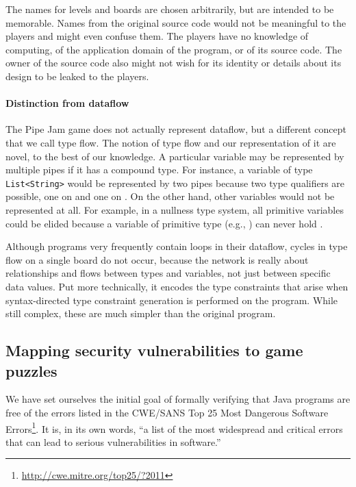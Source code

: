 \documentclass{sig-alternate}
\def\<#1>{\codeid{#1}}
\newcommand{\codeid}[1]{\ifmmode{\mbox{\ttfamily{#1}}}\else{\ttfamily #1}\fi}
\begin{document}
The names for levels and boards are chosen arbitrarily, but are intended to
be memorable.  Names from the original source code would not be meaningful
to the players and might even confuse them.  The players have no knowledge
of computing, of the application domain of the program, or of its source
code.  The owner of the source code also might not wish for its identity or
details about its design
to be leaked to the players.

\paragraph{Distinction from dataflow}
The Pipe Jam game does not actually represent dataflow, but a
different concept that we call type flow.  The notion of type flow and our
representation of it are
novel, to the best of our knowledge.  A particular variable may be
represented by multiple pipes if it has a compound type.  For
instance, a variable of type \verb|List<String>| would be represented
by two pipes because two type qualifiers are possible, one on \<List>
and one on \<String>.  On the other hand, other variables would not be
represented at all.  For example, in a nullness type system, all
primitive variables could be elided because a variable of primitive
type (e.g., \<int>) can never hold \<null>.


Although programs very frequently contain loops in their dataflow,
cycles in type flow on a single board do not occur, because the network is really
about relationships and flows between types and variables, not just
between specific data values.  Put more technically, it encodes the
type constraints that arise when syntax-directed type constraint
generation is performed on the program.  While still complex, these
are much simpler than the original program.


\subsection{Mapping security vulnerabilities to game puzzles}

We have set ourselves the initial goal of formally verifying that Java
programs are free of the errors
listed in the CWE/SANS Top 25 Most Dangerous Software
Errors\footnote{\url{http://cwe.mitre.org/top25/?2011}}.  It is, in its own words,
``a list of the most widespread and critical errors that can lead to
serious vulnerabilities in software.''
\end{document}
